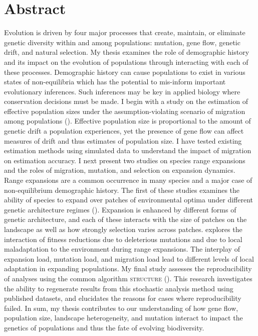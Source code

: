 \chapter*{Abstract}

Evolution is driven by four major processes that create, maintain, or eliminate genetic diversity within and among populations: mutation, gene flow, genetic drift, and natural selection. My thesis examines the role of demographic history and its impact on the evolution of populations through interacting with each of these processes. Demographic history can cause populations to exist in various states of non-equilibria which has the potential to mis-inform important evolutionary inferences. Such inferences may be key in applied biology where conservation decisions must be made. I begin with a study on the estimation of effective population sizes under the assumption-violating scenario of migration among populations (). Effective population size is proportional to the amount of genetic drift a population experiences, yet the presence of gene flow can affect measures of drift and thus estimates of population size. I have tested existing estimation methods using simulated data to understand the impact of migration on estimation accuracy. I next present two studies on species range expansions and the roles of migration, mutation, and selection on expansion dynamics. Range expansions are a common occurrence in many species and a major case of non-equilibrium demographic history. The first of these studies examines the ability of species to expand over patches of environmental optima under different genetic architecture regimes (). Expansion is enhanced by different forms of genetic architecture, and each of these interacts with the size of patches on the landscape as well as how strongly selection varies across patches.  explores the interaction of fitness reductions due to deleterious mutations and due to local maladaptation to the environment during range expansions. The interplay of expansion load, mutation load, and migration load lead to different levels of local adaptation in expanding populations. My final study assesses the reproducibility of analyses using the common algorithm \textsc{structure} (). This research investigates the ability to regenerate results from this stochastic analysis method using published datasets, and elucidates the reasons for cases where reproducibility failed. In sum, my thesis contributes to our understanding of how gene flow, population size, landscape heterogeneity, and mutation interact to impact the genetics of populations and thus the fate of evolving biodiversity.

